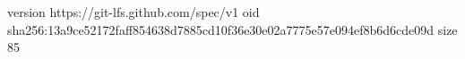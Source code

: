 version https://git-lfs.github.com/spec/v1
oid sha256:13a9ce52172faff854638d7885cd10f36e30e02a7775e57e094ef8b6d6cde09d
size 85
